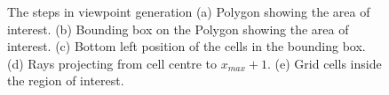 \begin{figure}
	\centering
	\caption[Structure of control messages.]{\small 
		The steps in viewpoint generation (a) Polygon showing the area of interest. (b) Bounding box on the Polygon showing the area of interest. (c) Bottom left position of the cells in the bounding box. (d) Rays projecting from cell centre to $x_{max} + 1$. (e)  Grid cells inside the region of interest. }
	
	
	

\end{figure}
